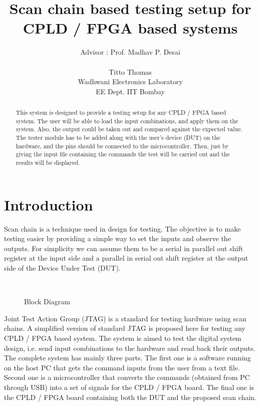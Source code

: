 \documentclass[a4paper,11pt]{article}
\title{\textbf{Scan chain based testing setup for\\CPLD / FPGA based systems}}
\author{Advisor : Prof. Madhav P. Desai \\ \\Titto Thomas \\ Wadhwani Electronics Laboratory \\ EE Dept. IIT Bombay}
\begin{document}
\maketitle

\begin{abstract}
This system is designed to provide a testing setup for any CPLD / FPGA based system. The user will be able to load the input combinations, and apply them on the system. Also, the output could be taken out and compared against the expected value. The tester module has to be added along with the user's device (DUT) on the hardware, and the pins should be connected to the microcontroller. Then, just by giving the input file containing the commands the test will be carried out and the results will be displayed.
\end{abstract}
\section{Introduction}
Scan chain is a technique used in design for testing. The objective is to make testing easier by providing a simple way to set the inputs and observe the outputs. For simplicity we can assume them to be a serial in parallel out shift register at the input side and a parallel in serial out shift register at the output side of the Device Under Test (DUT).

\begin{figure}[h!]
\centering
\\
\caption{Block Diagram}
\end{figure}

Joint Test Action Group (JTAG) is a standard  for testing hardware using scan chains. A simplified version of standard JTAG is proposed here for testing any CPLD / FPGA based system.
The system is aimed to test the digital system design, i.e. send input combinations to the hardware and read back their outputs. The complete system has mainly three parts. The first one is a software running on the host PC that gets the command inputs from the user from a text file. Second one is a microcontroller that converts the commands (obtained from PC through USB) into a set of signals for the CPLD / FPGA board. The final one is the CPLD / FPGA board containing both the DUT and the proposed scan chain.
\paragraph*{}
\end{document}

